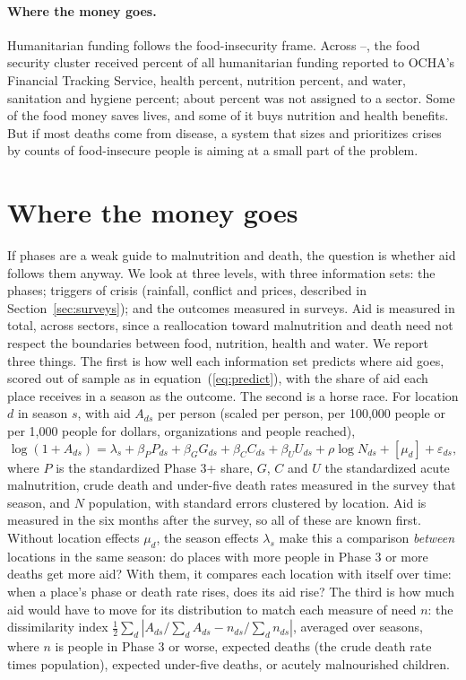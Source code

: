 \documentclass[11pt]{article}
\begin{document}
\paragraph{Where the money goes.} Humanitarian funding follows the food-insecurity frame. Across \ftsYearZero{}--\ftsYearOne{}, the food security cluster received \ftsFood{} percent of all humanitarian funding reported to OCHA's Financial Tracking Service, health \ftsHealth{} percent, nutrition \ftsNutrition{} percent, and water, sanitation and hygiene \ftsWash{} percent; about \ftsUntagged{} percent was not assigned to a sector. Some of the food money saves lives, and some of it buys nutrition and health benefits. But if most deaths come from disease, a system that sizes and prioritizes crises by counts of food-insecure people is aiming at a small part of the problem.

\section{Where the money goes}\label{sec:money}

If phases are a weak guide to malnutrition and death, the question is whether aid follows them anyway. We look at three levels, with three information sets: the phases; triggers of crisis (rainfall, conflict and prices, described in Section~\ref{sec:surveys}); and the outcomes measured in surveys. Aid is measured in total, across sectors, since a reallocation toward malnutrition and death need not respect the boundaries between food, nutrition, health and water. We report three things. The first is how well each information set predicts where aid goes, scored out of sample as in equation~(\ref{eq:predict}), with the share of aid each place receives in a season as the outcome. The second is a horse race. For location $d$ in season $s$, with aid $A_{ds}$ per person (scaled per person, per 100,000 people or per 1,000 people for dollars, organizations and people reached),
\begin{equation}\label{eq:aid}
\log(1 + A_{ds}) = \lambda_s + \beta_P P_{ds} + \beta_G G_{ds} + \beta_C C_{ds} + \beta_U U_{ds} + \rho \log N_{ds} + [\mu_d] + \varepsilon_{ds},
\end{equation}
where $P$ is the standardized Phase 3+ share, $G$, $C$ and $U$ the standardized acute malnutrition, crude death and under-five death rates measured in the survey that season, and $N$ population, with standard errors clustered by location. Aid is measured in the six months after the survey, so all of these are known first. Without location effects $\mu_d$, the season effects $\lambda_s$ make this a comparison \emph{between} locations in the same season: do places with more people in Phase 3 or more deaths get more aid? With them, it compares each location with itself over time: when a place's phase or death rate rises, does its aid rise? The third is how much aid would have to move for its distribution to match each measure of need $n$: the dissimilarity index $\tfrac12 \sum_d |A_{ds}/\sum_d A_{ds} - n_{ds}/\sum_d n_{ds}|$, averaged over seasons, where $n$ is people in Phase 3 or worse, expected deaths (the crude death rate times population), expected under-five deaths, or acutely malnourished children.
\end{document}
